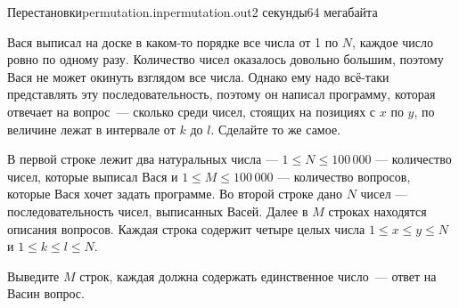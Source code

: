 \begin{problem}{Перестановки}{permutation.in}{permutation.out}{2 секунды}{64 мегабайта}


Вася выписал на доске в каком-то порядке все числа от 1 по $N$, каждое число ровно по одному разу. Количество чисел оказалось
довольно большим, поэтому Вася не может окинуть взглядом все числа. Однако ему надо всё-таки представлять эту последовательность, поэтому
он написал программу, которая отвечает на вопрос~--- сколько среди чисел, стоящих на позициях с $x$ по $y$, по величине лежат
в интервале от $k$ до $l$. Сделайте то же самое.

\InputFile

В первой строке лежит два натуральных числа --- $1\le N\le 100\,000$ --- количество чисел, которые выписал Вася и 
$1\le M\le 100\,000$ --- количество вопросов, которые Вася хочет задать программе.
Во второй строке дано $N$ чисел --- последовательность чисел, выписанных Васей. 
Далее в $M$ строках находятся описания вопросов. Каждая строка содержит четыре целых числа $1\le x\le y\le N$ и
$1\le k\le l\le N$.

\OutputFile

Выведите $M$ строк, каждая должна содержать единственное число~--- ответ на Васин вопрос.

\Example

\begin{example}%
%
\end{example}

\end{problem}
